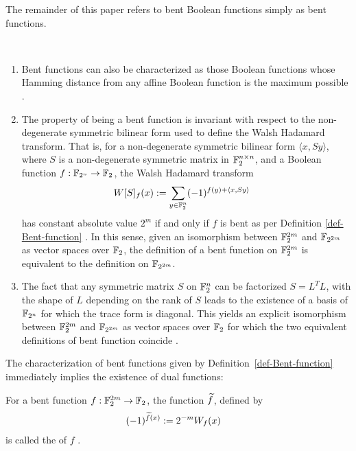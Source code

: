 The remainder of this paper refers to bent Boolean functions simply as bent functions.
\begin{remarks}~

\begin{enumerate}
\item
Bent functions can also be characterized as those Boolean functions whose Hamming distance
from any affine Boolean function is the maximum possible \cite[Ch. 14 Theorem 6]{MacS77} \cite[Theorem 3.3]{MeiS90}.
\item
The property of being a bent function is invariant with respect to the non-degenerate symmetric bilinear form used to define
the Walsh Hada\-mard transform.
That is, for a non-degenerate symmetric bilinear form $\langle x, S y \rangle$, where $S$ is a non-degenerate symmetric matrix in $\mathbb{F}_2^{n \times n}$,
and a Boolean function $f : \mathbb{F}_{2^n} \rightarrow \mathbb{F}_2$, the Walsh Hada\-mard transform
\begin{align*}
W[S]_f(x)
&:=
\sum_{y \in \mathbb{F}_2^n} (-1)^{f(y) + \langle x, S y \rangle}
\end{align*}
has constant absolute value $2^{m}$ if and only if $f$ is bent as per Definition \ref{def-Bent-function} \cite{DinMTX2018cyclic}.
In this sense, given an isomorphism between $\mathbb{F}_2^{2m}$ and $\mathbb{F}_{2^{2m}}$ as vector spaces over $\mathbb{F}_2$,
the definition of a bent function on $\mathbb{F}_2^{2m}$ is equivalent to the definition on $\mathbb{F}_{2^{2m}}$.
\item
The fact that any symmetric matrix $S$ on $\mathbb{F}_2^n$ can be factorized $S=L^T L$, with the shape of $L$ depending on the rank of $S$ \cite{Lem1975matrix}
leads to the existence of a basis of $\mathbb{F}_{2^n}$ for which the trace form is diagonal.
This yields an explicit isomorphism between $\mathbb{F}_2^{2m}$ and $\mathbb{F}_{2^{2m}}$ as vector spaces over $\mathbb{F}_2$ for which the two equivalent definitions
of bent function coincide \cite[p. 860]{OlSW1975}.
\end{enumerate}
%
\end{remarks}

The characterization of bent functions given by Definition~\ref{def-Bent-function} immediately
implies the existence of dual functions:
\begin{Definition}
\label{def-dual-Bent-function}
For a bent function $f : \mathbb{F}_2^{2m} \rightarrow \mathbb{F}_2$, the function $\widetilde{f}$, defined by
\begin{align*}
(-1)^{\widetilde{f}(x)} &:= 2^{-m} W_f(x)
\end{align*}
is called the  of $f$ \cite{CarDPS10self}.
\end{Definition}

